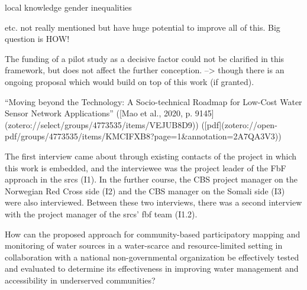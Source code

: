 local knowledge
gender inequalities

etc. not really mentioned but have huge potential to improve all of this. Big question is HOW!

The funding of a pilot study as a decisive factor could not be clarified in this framework, but does not affect the further conception. --> though there is an ongoing proposal which would build on top of this work (if granted).



“Moving beyond the Technology: A Socio-technical Roadmap for Low-Cost Water Sensor Network Applications” ([Mao et al., 2020, p. 9145](zotero://select/groups/4773535/items/VEJUB8D9)) ([pdf](zotero://open-pdf/groups/4773535/items/KMCIFXB8?page=1&annotation=2A7QA3V3))



The first interview came about through existing contacts of the project in which this work is embedded, and the interviewee was the project leader of the FbF approach in the \acrshort{srcs} (I1). In the further course, the CBS project manager on the Norwegian Red Cross side (I2) and the CBS manager on the Somali side (I3) were also interviewed. Between these two interviews, there was a second interview with the project manager of the \acrshort{srcs}' \acrshort{fbf} team (I1.2).




How can the proposed approach for community-based participatory mapping and monitoring of water sources in a water-scarce and resource-limited setting in collaboration with a national non-governmental organization be effectively tested and evaluated to determine its effectiveness in improving water management and accessibility in underserved communities?




